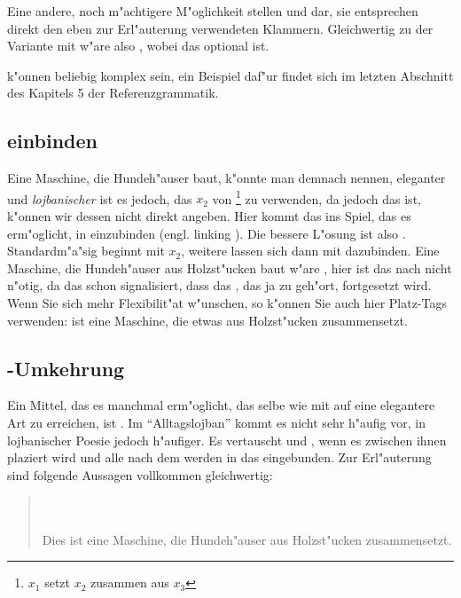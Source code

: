 Eine andere, noch m"achtigere M"oglichkeit stellen  und  dar, sie entsprechen direkt den eben zur Erl"auterung verwendeten
Klammern. Gleichwertig zu der Variante mit  w"are also , wobei das  optional ist.

 k"onnen beliebig komplex sein, ein Beispiel daf"ur findet sich im letzten Abschnitt des Kapitels 5 der Referenzgrammatik.

\subsection{ einbinden}
Eine Maschine, die Hundeh"auser baut, k"onnte man demnach  nennen, eleganter und \emph{lojbanischer} ist es jedoch,
 das $x_2$ von \footnote{$x_1$ setzt $x_2$ zusammen aus $x_3$} zu verwenden, da  jedoch das  ist, k"onnen
wir dessen  nicht direkt angeben. Hier kommt das   ins Spiel, das es erm"oglicht,  in 
einzubinden (engl. linking ).
Die bessere L"osung ist also . Standardm"a"sig beginnt  mit $x_2$, weitere  lassen
sich dann mit  dazubinden. Eine Maschine, die Hundeh"auser aus Holzst"ucken baut w"are , hier ist das  nach  nicht n"otig, da das  schon signalisiert, dass das , das ja zu  geh"ort, fortgesetzt wird.
Wenn Sie sich mehr Flexibilit"at w"unschen, so k"onnen Sie auch hier Platz-Tags verwenden:  ist eine
Maschine, die etwas aus Holzst"ucken zusammensetzt.

\subsection{-Umkehrung}
Ein Mittel, das es manchmal erm"oglicht, das selbe wie mit  auf eine elegantere Art zu erreichen, ist . Im ``Alltagslojban''
kommt es nicht sehr h"aufig vor, in lojbanischer Poesie jedoch h"aufiger.
Es vertauscht  und , wenn es zwischen ihnen plaziert wird und alle  nach dem  werden in das
 eingebunden. Zur Erl"auterung sind folgende Aussagen vollkommen gleichwertig:
\begin{quote}
 \\
 \\
Dies ist eine Maschine, die Hundeh"auser aus Holzst"ucken zusammensetzt.
\end{quote}


